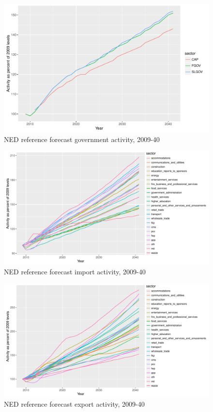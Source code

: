 \begin{figure}
\centering
\includegraphics[width=6.5in]{ned/government_forecast.pdf}
\caption{NED reference forecast government activity, 2009-40}
\end{figure}

\begin{figure}
\centering
\includegraphics[width=7in]{ned/trade_forecast_imports.pdf}
\caption{NED reference forecast import activity, 2009-40}
\end{figure}

\begin{figure}
\centering
\includegraphics[width=7in]{ned/trade_forecast_exports}
\caption{NED reference forecast export activity, 2009-40}
\end{figure}

